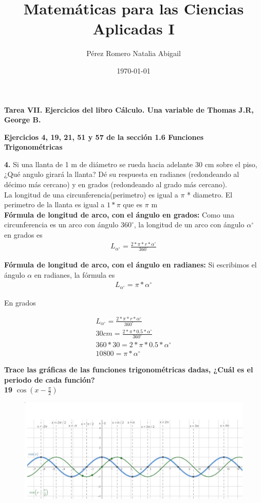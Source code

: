 \documentclass[12pt, letterpaper]{article}
\title{Matemáticas para las Ciencias Aplicadas I}
\author{Pérez Romero Natalia Abigail}
\date{\today}
\begin{document}
\maketitle
\textbf{Tarea VII. Ejercicios del libro Cálculo. Una variable de Thomas J.R, George B.}

\textbf{Ejercicios 4, 19, 21, 51 y 57  de  la sección 1.6 Funciones Trigonométricas}

\textbf{4.} Si una llanta de 1 m de diámetro se rueda hacia adelante 30 cm sobre el piso, ¿Qué angulo girará la llanta? Dé su respuesta en radianes (redondeando al décimo más cercano) y en grados (redondeando al grado más cercano).\\

La longitud de una circunferencia(perimetro) es  igual a $\pi$ * diametro. El perimetro de la llanta es igual a $1 * \pi$ que es $\pi$ m\\

\textbf{Fórmula de longitud de arco, con el ángulo en grados:}
Como una circunferencia es un arco con ángulo $360 ^{\circ}$, la longitud de un arco con ángulo $\alpha ^{\circ}$ en grados es
\begin{align*}
	L_{\alpha ^{\circ}}=  \frac{2 * \pi * r *  \alpha^{\circ}}{360^{ \circ}}
\end{align*}

\textbf{Fórmula de longitud de arco, con el ángulo en radianes:}
Si escribimos el ángulo $\alpha$ en radianes, la fórmula es
\begin{align*}
	L_{\alpha ^{\circ}}= \pi * \alpha^{\circ}
\end{align*}


En grados  

\begin{align*}
	L_{\alpha ^{\circ}}=  \frac{2 * \pi * r *  \alpha^{\circ}}{360^{ \circ}} \\
	30 cm =  \frac{2 * \pi * 0.5 *  \alpha^{\circ}}{360^{ \circ}}\\
	360 * 30 = 2 * \pi * 0.5 *  \alpha^{\circ}\\
	10800 = \pi * \alpha^{\circ}
\end{align*}




\textbf{Trace las gráficas de las funciones trigonométricas dadas, ¿Cuál es el periodo de cada función?}\\
\textbf{19} $\cos (x - \frac{\pi}{2})$

\begin{figure}[ht]
\centering
\includegraphics[width=40em]{t7dos}
\end{figure}
\end{document}
